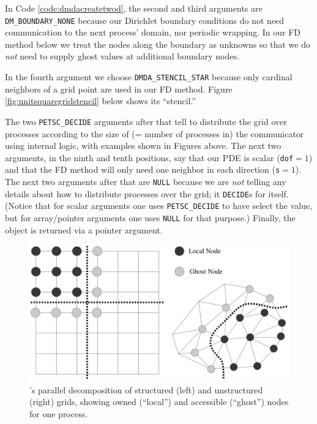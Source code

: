 In Code \ref{code:dmdacreatetwod}, the second and third arguments are \texttt{DM\_BOUNDARY\_NONE} because our Dirichlet boundary conditions do not need communication to the next process' domain, nor periodic wrapping.  In our FD method below we treat the nodes along the boundary as unknowns so that we do \emph{not} need \PETSc to supply ghost values at additional boundary nodes.

In the fourth argument we choose \texttt{DMDA\_STENCIL\_STAR} because only cardinal neighbors of a grid point are used in our FD method.  Figure \ref{fig:unitsquaregridstencil} below shows its ``stencil.''

The two \texttt{PETSC\_DECIDE} arguments after that tell \PETSc to distribute the grid over processes according to the size of (= number of processes in) the \MPI communicator using \PETSc internal logic, with examples shown in Figures above.  The next two arguments, in the ninth and tenth positions, say that our PDE is scalar (\texttt{dof}$=1$) and that the FD method will only need one neighbor in each direction (\texttt{s}$=1$).  The next two arguments after that are \texttt{NULL} because we are \emph{not} telling \PETSc any details about how to distribute processes over the grid; it \texttt{DECIDE}s for itself.  (Notice that for scalar arguments one uses \texttt{PETSC\_DECIDE} to have \PETSc select the value, but for array/pointer arguments one uses \texttt{NULL} for that purpose.)  Finally, the \pDMDA object is returned via a pointer argument.

\medskip
\begin{figure}
\includegraphics[width=\textwidth]{figs/petscghostvalues}
\caption{\PETSc's parallel decomposition of structured (left) and unstructured (right) grids, showing owned (``local'') and accessible (``ghost'') nodes for one process.}
\label{fig:petscghostvalues}
\end{figure}

